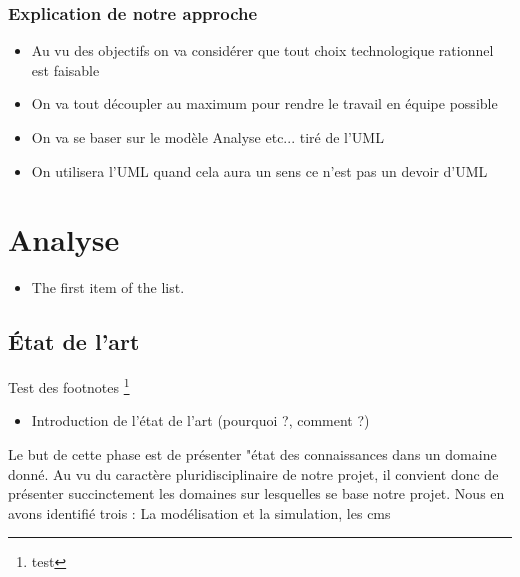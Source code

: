 \documentclass{rapport_stage}
\begin{document}
\section{Explication de notre approche}

\begin{itemize}[label=$\bullet$]
  \item Au vu des objectifs on va considérer que tout choix technologique rationnel est faisable
  \item On va tout découpler au maximum pour rendre le travail en équipe possible
  \item On va se baser sur le modèle Analyse etc... tiré de l'UML
  \item On utilisera l'UML quand cela aura un sens ce n'est pas un devoir d'UML
\end{itemize}




\part{Analyse}

\begin{itemize}[label=$\bullet$]
  \item The first item of the list.
\end{itemize}



\chapter{État de l'art}


Test des footnotes \footnote{test}
\begin{itemize}[label=$\bullet$]
  \item Introduction de l'état de l'art (pourquoi ?, comment ?)
\end{itemize}

Le but de cette phase est de présenter "état des connaissances dans un domaine
donné. Au vu du caractère pluridisciplinaire de notre projet, il convient donc
de présenter succinctement les domaines sur lesquelles se base notre projet.
Nous en avons identifié trois : La modélisation et la simulation, les
\gls{cms}
\end{document}
